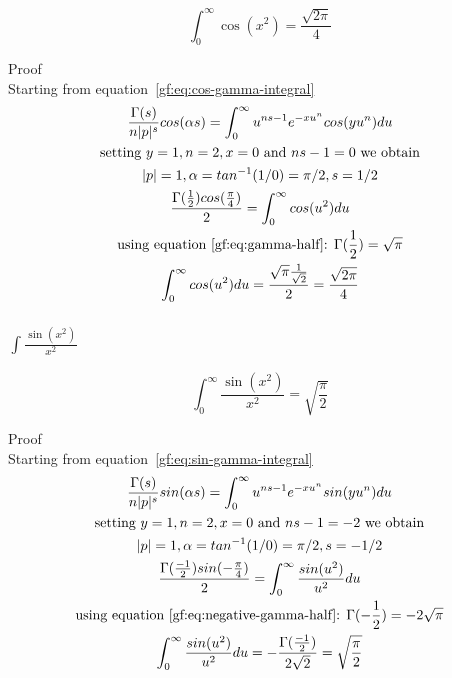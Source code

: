 \documentclass[a4paper]{article}
\begin{document}
    \begin{theorem}
        \begin{equation}
            \boxed{
                \int_{0}^{\infty} \cos(x^2) = \frac{\sqrt{2\pi}}{4}
            }\label{gf:eq:equation20}
        \end{equation}

        Proof
        \\
        Starting from equation~\ref{gf:eq:cos-gamma-integral}
        \begin{gather*}
            \frac{\Gamma(s)}{n |p|^s} cos(\alpha s)= \int_{0}^{\infty} u^{ns -1} e^{-x u^{n}} cos(y u^n) du
            \\
            \text{setting $y=1, n=2, x=0$ and $ns -1 = 0$ we obtain}
            \\
            |p| = 1, \alpha = tan^{-1}(1/0) = \pi/2, s = 1/2
            \\
            \frac{\Gamma(\frac{1}{2}) cos(\frac{\pi}{4})}{2} = \int_{0}^{\infty} cos(u^2) du
            \\
            \text{using equation~\ref{gf:eq:gamma-half}: } \Gamma(\frac{1}{2}) = \sqrt{\pi}
            \\
            \int_{0}^{\infty} cos(u^2) du = \frac{\sqrt{\pi} \frac{1}{\sqrt{2}}}{2}
            = \frac{\sqrt{2\pi}}{4}
        \end{gather*}
    \end{theorem}

    \subsubsection{\texorpdfstring{$\int \frac{\sin(x^2)}{x^2}$}{Integral of sin(x^2)/x^2}}

    \begin{theorem}
        \begin{equation}
            \boxed{
                \int_{0}^{\infty} \frac{\sin(x^2)}{x^2} = \sqrt{\frac{\pi}{2}}
            }\label{gf:eq:equation21}
        \end{equation}

        Proof
        \\
        Starting from equation~\ref{gf:eq:sin-gamma-integral}
        \begin{gather*}
            \frac{\Gamma(s)}{n |p|^s} sin(\alpha s)= \int_{0}^{\infty} u^{ns -1} e^{-x u^{n}} sin(y u^n) du
            \\
            \text{setting $y=1, n=2, x=0$ and $ns -1 = -2$ we obtain}
            \\
            |p| = 1, \alpha = tan^{-1}(1/0) = \pi/2, s = -1/2
            \\
            \frac{\Gamma(\frac{-1}{2}) sin(-\frac{\pi}{4})}{2} = \int_{0}^{\infty} \frac{sin(u^2)}{u^2} du
            \\
            \text{using equation~\ref{gf:eq:negative-gamma-half}: } \Gamma(-\frac{1}{2}) = -2\sqrt{\pi}
            \\
            \int_{0}^{\infty} \frac{sin(u^2)}{u^2} du = -\frac{\Gamma(\frac{-1}{2})}{2\sqrt{2}} =
            \sqrt{\frac{\pi}{2}}
        \end{gather*}
    \end{theorem}
\end{document}
